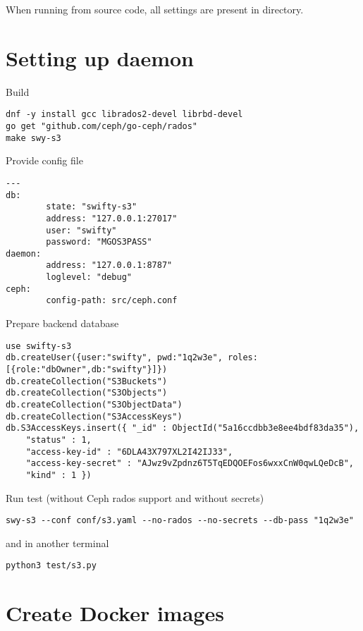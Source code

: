 When running from  source code, all settings are present
in  directory.

\section{Setting up  daemon}
\label{sec:setup-swy-s3}


Build 

\begin{lstlisting}
dnf -y install gcc librados2-devel librbd-devel
go get "github.com/ceph/go-ceph/rados"
make swy-s3
\end{lstlisting}

Provide config file 

\begin{lstlisting}
---
db:
        state: "swifty-s3"
        address: "127.0.0.1:27017"
        user: "swifty"
        password: "MGOS3PASS"
daemon:
        address: "127.0.0.1:8787"
        loglevel: "debug"
ceph:
        config-path: src/ceph.conf
\end{lstlisting}

Prepare backend database

\begin{lstlisting}
use swifty-s3
db.createUser({user:"swifty", pwd:"1q2w3e", roles:[{role:"dbOwner",db:"swifty"}]})
db.createCollection("S3Buckets")
db.createCollection("S3Objects")
db.createCollection("S3ObjectData")
db.createCollection("S3AccessKeys")
db.S3AccessKeys.insert({ "_id" : ObjectId("5a16ccdbb3e8ee4bdf83da35"),
	"status" : 1,
	"access-key-id" : "6DLA43X797XL2I42IJ33",
	"access-key-secret" : "AJwz9vZpdnz6T5TqEDQOEFos6wxxCnW0qwLQeDcB",
	"kind" : 1 })
\end{lstlisting}

Run test (without Ceph rados support and without secrets)

\begin{lstlisting}
swy-s3 --conf conf/s3.yaml --no-rados --no-secrets --db-pass "1q2w3e"
\end{lstlisting}

and in another terminal

\begin{lstlisting}
python3 test/s3.py
\end{lstlisting}

\section{Create Docker images}
\label{sec:setup-images}

